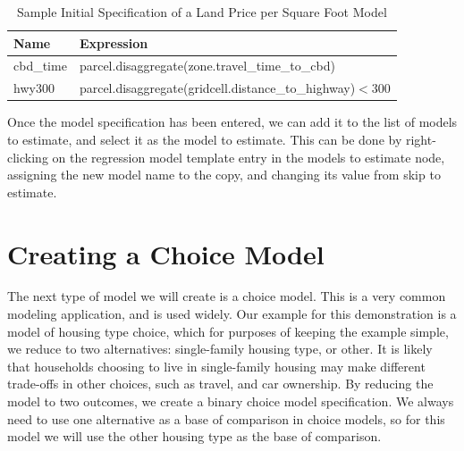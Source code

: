 
\begin{table}[htp]
\caption{Sample Initial Specification of a Land Price per Square Foot Model}
\label{tab:land-price-sqft-model-specification}
\begin{center}
\begin{tabular}{ p{1.5in}  p{4.0in}  }
\toprule[1.5pt]
Name & Expression \\
\midrule
cbd\_time & parcel.disaggregate(zone.travel\_time\_to\_cbd)\\
hwy300 & parcel.disaggregate(gridcell.distance\_to\_highway)$<$300\\
\bottomrule
\end{tabular}
\end{center}
\end{table}


Once the model specification has been entered, we can add it to the list of models to estimate, and select it as the model to estimate.  This can be done by right-clicking on the regression model template entry in the models to estimate node, assigning the new model name to the copy, and changing its value from skip to estimate.  %



\section{Creating a Choice Model}
The next type of model we will create is a choice model.  This is a very common modeling application, and is used widely.  Our example for this demonstration is a model of housing type choice, which for purposes of keeping the example simple, we reduce to two alternatives: single-family housing type, or other.  It is likely that households choosing to live in single-family housing may make different trade-offs in other choices, such as travel, and car ownership.  By reducing the model to two outcomes, we create a binary choice model specification.  We always need to use one alternative as a base of comparison in choice models, so for this model we will use the other housing type as the base of comparison.  

